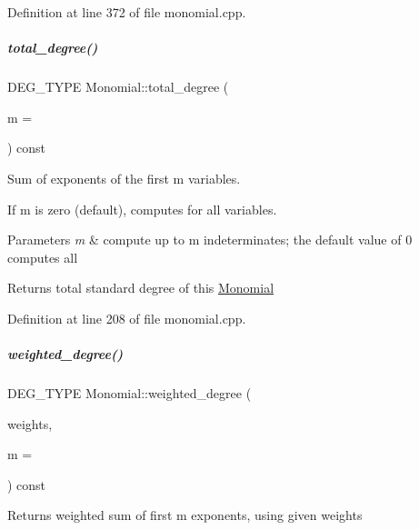 Definition at line 372 of file monomial.\+cpp.

\mbox{\label{group__polygroup_afe6df62857d9f58634d5f6c668f12d35}} 
\subparagraph{\texorpdfstring{total\+\_\+degree()}{total\_degree()}}
{\footnotesize\ttfamily D\+E\+G\+\_\+\+T\+Y\+PE Monomial\+::total\+\_\+degree (\begin{DoxyParamCaption}\item[{N\+V\+A\+R\+\_\+\+T\+Y\+PE}]{m = {} }\end{DoxyParamCaption}) const}



Sum of exponents of the first {\ttfamily m} variables. 

If {\ttfamily m} is zero (default), computes for all variables. 
\begin{DoxyParams}{Parameters}
{\em m} & compute up to {\ttfamily m} indeterminates; the default value of 0 computes all \\
\hline
\end{DoxyParams}
\begin{DoxyReturn}{Returns}
total standard degree of this \hyperlink{group__polygroup_class_monomial}{Monomial} 
\end{DoxyReturn}


Definition at line 208 of file monomial.\+cpp.

\mbox{\label{group__polygroup_a5b19863967dc9801997d2d1058f312a3}} 
\subparagraph{\texorpdfstring{weighted\+\_\+degree()}{weighted\_degree()}}
{\footnotesize\ttfamily D\+E\+G\+\_\+\+T\+Y\+PE Monomial\+::weighted\+\_\+degree (\begin{DoxyParamCaption}\item[{const W\+T\+\_\+\+T\+Y\+PE $\ast$}]{weights,  }\item[{N\+V\+A\+R\+\_\+\+T\+Y\+PE}]{m = {} }\end{DoxyParamCaption}) const}

\begin{DoxyReturn}{Returns}
weighted sum of first {\ttfamily m} exponents, using given {\ttfamily weights} 
\end{DoxyReturn}

